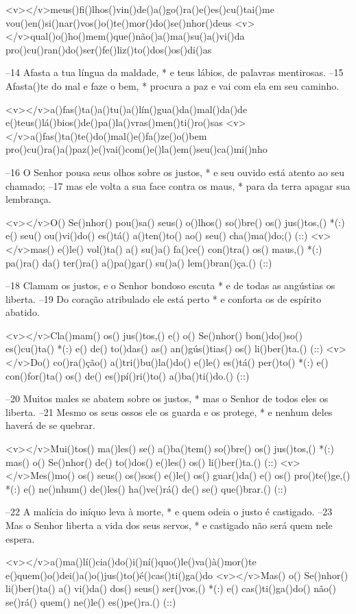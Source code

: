 <v></v>meus()fi()lhos()vin()de()a()go()ra()e()es()cu()tai()me
vou()en()si()nar()vos()o()te()mor()do()se()nhor()deus
<v></v>qual()o()ho()mem()que()não()a()ma()su()a()vi()da
pro()cu()ran()do()ser()fe()liz()to()dos()os()di()as

–14 Afasta a tua língua da maldade, *
e teus lábios, de palavras mentirosas.
–15 Afasta()te do mal e faze o bem, *
procura a paz e vai com ela em seu caminho.

<v></v>a()fas()ta()a()tu()a()lín()gua()da()mal()da()de
e()teus()lá()bios()de()pa()la()vras()men()ti()ro()sas
<v></v>a()fas()ta()te()do()mal()e()fa()ze()o()bem
pro()cu()ra()a()paz()e()vai()com()e()la()em()seu()ca()mi()nho

–16 O Senhor pousa seus olhos sobre os justos, *
e seu ouvido está atento ao seu chamado;
–17 mas ele volta a sua face contra os maus, *
para da terra apagar sua lembrança.

<v></v>O() Se()nhor() pou()sa() seus() o()lhos() so()bre() os() jus()tos,() *(:)
e() seu() ou()vi()do() es()tá() a()ten()to() ao() seu() cha()ma()do;() (::)
<v></v>mas() e()le() vol()ta() a() su()a() fa()ce() con()tra() os() maus,() *(:)
pa()ra() da() ter()ra() a()pa()gar() su()a() lem()bran()ça.() (::)

–18 Clamam os justos, e o Senhor bondoso escuta *
e de todas as angústias os liberta.
–19 Do coração atribulado ele está perto *
e conforta os de espírito abatido.

<v></v>Cla()mam() os() jus()tos,() e() o() Se()nhor() bon()do()so() es()cu()ta() *(:)
e() de() to()das() as() an()gús()tias() os() li()ber()ta.() (::)
<v></v>Do() co()ra()ção() a()tri()bu()la()do() e()le() es()tá() per()to() *(:)
e() con()for()ta() os() de() es()pí()ri()to() a()ba()ti()do.() (::)

–20 Muitos males se abatem sobre os justos, *
mas o Senhor de todos eles os liberta.
–21 Mesmo os seus ossos ele os guarda e os protege, *
e nenhum deles haverá de se quebrar.

<v></v>Mui()tos() ma()les() se() a()ba()tem() so()bre() os() jus()tos,() *(:)
mas() o() Se()nhor() de() to()dos() e()les() os() li()ber()ta.() (::)
<v></v>Mes()mo() os() seus() os()sos() e()le() os() guar()da() e() os() pro()te()ge,() *(:)
e() ne()nhum() de()les() ha()ve()rá() de() se() que()brar.() (::)

–22 A malícia do iníquo leva à morte, *
e quem odeia o justo é castigado.
–23 Mas o Senhor liberta a vida dos seus servos, *
e castigado não será quem nele espera.

<v></v>a()ma()lí()cia()do()i()ní()quo()le()va()à()mor()te
e()quem()o()dei()a()o()jus()to()é()cas()ti()ga()do
<v></v>Mas() o() Se()nhor() li()ber()ta() a() vi()da() dos() seus() ser()vos,() *(:)
e() cas()ti()ga()do() não() se()rá() quem() ne()le() es()pe()ra.() (::)